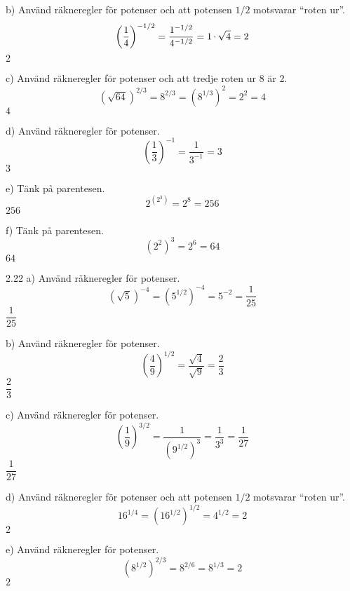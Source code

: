 \begin{task}{b)}
	Använd räkneregler för potenser och att potensen $1/2$ motsvarar ``roten ur''.
	\[\left(\dfrac{1}{4}\right)^{-1/2}=
	\dfrac{1^{-1/2}}{4^{-1/2}}=
	1\operatorname{\cdot}\sqrt{4}=
	2\]
	\ans $2$
\end{task}

\begin{task}{c)}
	Använd räkneregler för potenser och att tredje roten ur 8 är 2.
	\[(\sqrt{64})^{2/3}=
	8^{2/3}=
	(8^{1/3})^2=
	2^2=
	4\]
	\ans $4$
\end{task}

\begin{task}{d)}
	Använd räkneregler för potenser.
	\[\left(\frac{1}{3}\right)^{-1}=\frac{1}{3^{-1}}=3\]
	\ans $3$
\end{task}

\begin{task}{e)}
	Tänk på parentesen.
	\[2^{(2^3)}=2^8=256\]
	\ans $256$
\end{task}

\begin{task}{f)}
	Tänk på parentesen.
	\[(2^2)^3=2^6=64\]
	\ans $64$
\end{task}

\begin{task}{2.22 a)}
	Använd räkneregler för potenser.
	\[(\sqrt{5})^{-4}=(5^{1/2})^{-4}=5^{-2}=\frac{1}{25}\]
	\ans $\dfrac{1}{25}$
\end{task}

\begin{task}{b)}
	Använd räkneregler för potenser.
	\[\left(\frac{4}{9}\right)^{1/2}=\frac{\sqrt{4}}{\sqrt{9}}=\frac{2}{3}\]
	\ans $\dfrac{2}{3}$
\end{task}

\begin{task}{c)}
	Använd räkneregler för potenser.
	\[\left(\frac{1}{9}\right)^{3/2}=\frac{1}{(9^{1/2})^3}=\frac{1}{3^3}=\frac{1}{27}\]
	\ans $\dfrac{1}{27}$
\end{task}

\begin{task}{d)}
	Använd räkneregler för potenser och att potensen $1/2$ motsvarar ``roten ur''.
	\[16^{1/4}=(16^{1/2})^{1/2}=4^{1/2}=2\]
	\ans $2$
\end{task}

\begin{task}{e)}
	Använd räkneregler för potenser.
	\[(8^{1/2})^{2/3}=8^{2/6}=8^{1/3}=2\]
	\ans $2$
\end{task}

